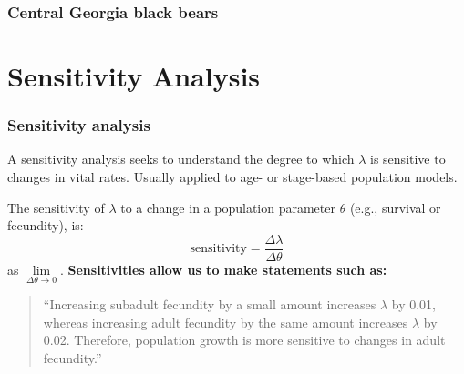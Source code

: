 \documentclass[color=usenames,dvipsnames]{beamer}\usepackage[]{graphicx}\usepackage[]{xcolor}
\begin{document}
\begin{frame}
  \frametitle{Central Georgia black bears}
\end{frame}






\section{Sensitivity Analysis}


\begin{frame}
  \frametitle{Sensitivity analysis}
  A sensitivity analysis seeks to understand the degree to which
  $\lambda$ is sensitive to changes in vital rates.
  \pause
  \vfill
  Usually applied to age- or stage-based population models. \par
  \pause
  \vfill
  The sensitivity of $\lambda$ to a change in a population parameter
  $\theta$ (e.g., survival or fecundity), is:
  \[
    \text{sensitivity} = \frac{\Delta \lambda}{\Delta \theta}
  \]
  as $\lim\limits_{\Delta \theta \to 0}$. 
  \pause
  \vfill
  {\bf Sensitivities allow us to make statements such as:} \\
  \begin{quote}
  ``Increasing subadult fecundity by a small amount increases
  $\lambda$ by 0.01, whereas increasing adult fecundity by the same
  amount increases $\lambda$ by 0.02. Therefore, population growth is
  more sensitive to changes in adult fecundity.''
  \end{quote}
\end{frame}
\end{document}
